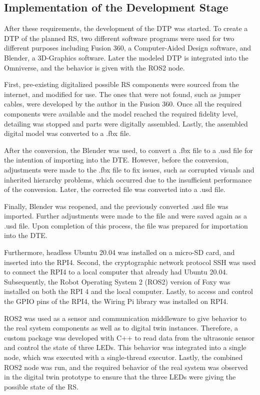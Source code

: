 \documentclass[conference]{IEEEtran}
\begin{document}
    \subsection{Implementation of the Development Stage}
    After these requirements, the development of the DTP was started. To create a DTP of the planned RS, two different software programs were used for two different purposes including Fusion 360, 
    a Computer-Aided Design software, and Blender, a 3D-Graphics software. Later the modeled DTP is integrated into the Omniverse, and the behavior is given with the ROS2 node.

    First, pre-existing digitalized possible RS components were sourced from the internet, and modified for use. The ones that were not found, such as jumper cables, were developed by the author 
    in the Fusion 360. Once all the required components were available and the model reached the required fidelity level, detailing was stopped and parts were digitally assembled. 
    Lastly, the assembled digital model was converted to a .fbx file.

    After the conversion, the Blender was used, to convert a .fbx file to a .usd file for the intention of importing into the DTE. However, before the conversion, 
    adjustments were made to the .fbx file to fix issues, such as corrupted visuals and inherited hierarchy problems, which occurred due to the insufficient performance of the conversion. 
    Later, the corrected file was converted into a .usd file. 

    Finally, Blender was reopened, and the previously converted .usd file was imported. Further adjustments were made to the file and were saved again as a .usd file. Upon completion of this process, 
    the file was prepared for importation into the DTE.

    Furthermore, headless Ubuntu 20.04 was installed on a micro-SD card, and inserted into the RPI4. Second, the cryptographic network protocol SSH was used to connect the RPI4 to a local computer that already had Ubuntu 20.04.
     Subsequently, the Robot Operating System 2 (ROS2) version of Foxy was installed on both the RPI 4 and the local computer. 
     Lastly, to access and control the GPIO pins of the RPI4, the Wiring Pi library was installed on RPI4.

    ROS2 was used as a sensor and communication middleware to give behavior to the real system components as well as to digital twin instances. 
    Therefore, a custom package was developed with C++  to read data from the ultrasonic sensor and control the state of three LEDs. This behavior was integrated into a single node, which was executed with a single-thread executor. Lastly, the combined ROS2 node was run, and the required behavior of the real system was observed in the digital twin prototype to ensure that the three LEDs were giving the possible state of the RS.
\end{document}
